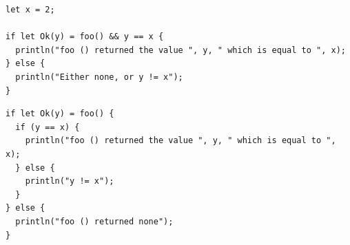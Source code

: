 

\begin{lstlisting}[style=coloredverbatim, caption=Using a pattern guard]
let x = 2;

if let Ok(y) = foo() && y == x {
  println("foo () returned the value ", y, " which is equal to ", x);
} else {
  println("Either none, or y != x");
}
\end{lstlisting}

\begin{lstlisting}[style=coloredverbatim, caption=Using a second condition instead of pattern guard, label=lst:flow:using_second_cond_no_guard]
if let Ok(y) = foo() {
  if (y == x) {
    println("foo () returned the value ", y, " which is equal to ", x);
  } else {
    println("y != x");
  }
} else {
  println("foo () returned none");
}
\end{lstlisting}

\vfill%
\pagebreak

